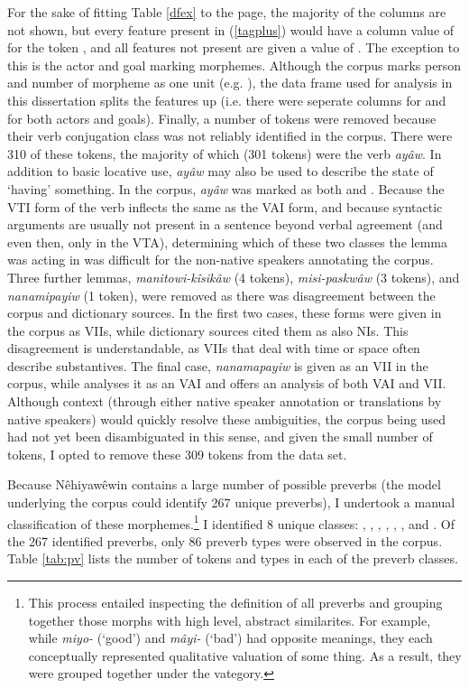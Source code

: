 For the sake of fitting Table \ref{dfex} to the page, the majority of the columns are not shown, but every feature present in (\ref{tagplus}) would have a column value of  for the token , and all features not present are given a value of . The exception to this is the actor and goal marking morphemes. Although the corpus marks person and number of morpheme as one unit (e.g. ), the data frame used for analysis in this dissertation splits the features up (i.e. there were seperate columns for  and  for both actors and goals). Finally, a number of tokens were removed because their verb conjugation class was not reliably identified in the corpus. There were 310 of these tokens, the majority of which (301 tokens) were the verb \textit{ayâw}. In addition to basic locative use, \textit{ayâw} may also be used to describe the state of `having' something. In the corpus, \textit{ayâw} was marked as both  and . Because the VTI form of the verb inflects the same as the VAI form, and because syntactic arguments are usually not present in a sentence beyond verbal agreement (and even then, only in the VTA), determining which of these two classes the lemma was acting in was difficult for the non-native speakers annotating the corpus. Three further lemmas, \textit{manitowi-kîsikâw} (4 tokens), \textit{misi-paskwâw} (3 tokens), and \textit{nanamipayiw} (1 token), were removed as there was disagreement between the corpus and dictionary sources. In the first two cases, these forms were given in the corpus as VIIs, while dictionary sources cited them as also NIs. This disagreement is understandable, as VIIs that deal with time or space often describe substantives. The final case, \textit{nanamapayiw} is given as an VII in the corpus, while \citet{Wolvengrey2001} analyses it as an VAI and \citet{leclaire1998alberta} offers an analysis of both VAI and VII. Although context (through either native speaker annotation or translations by native speakers) would quickly resolve these ambiguities, the corpus being used had not yet been disambiguated in this sense, and given the small number of tokens, I opted to remove these 309 tokens from the data set. 

Because Nêhiyawêwin contains a large number of possible preverbs (the model underlying the corpus could identify 267 unique preverbs), I undertook a manual classification of these morphemes.\footnote{This process entailed inspecting the definition of all preverbs and grouping together those morphs with high level, abstract similarites. For example, while \textit{miyo-} (`good') and \textit{mâyi-} (`bad') had opposite meanings, they each conceptually represented qualitative valuation of some thing. As a result, they were grouped together under the  vategory.} I identified 8 unique classes: , , , , , ,  and . Of the 267 identified preverbs, only 86 preverb types were observed in the corpus. Table \ref{tab:pv} lists the number of tokens and types in each of the preverb classes.

